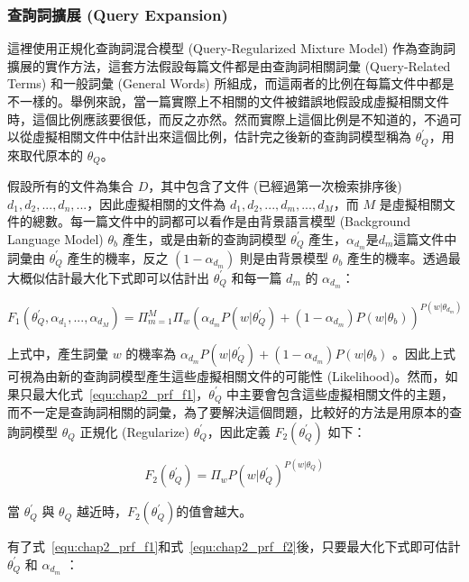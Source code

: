\subsubsection{查詢詞擴展 (Query Expansion)}
\label{sec:prf}
這裡使用正規化查詢詞混合模型 (Query-Regularized Mixture Model) 作為查詢詞擴展的實作方法，這套方法假設每篇文件都是由查詢詞相關詞彙 (Query-Related Terms) 和一般詞彙 (General Words)
所組成，而這兩者的比例在每篇文件中都是不一樣的。舉例來說，當一篇實際上不相關的文件被錯誤地假設成虛擬相關文件時，這個比例應該要很低，而反之亦然。然而實際上這個比例是不知道的，不過可以從虛擬相關文件中估計出來這個比例，估計完之後新的查詢詞模型稱為 $\theta_Q^{'}$，用來取代原本的 $\theta_Q$。

假設所有的文件為集合 $D$，其中包含了文件 (已經過第一次檢索排序後) ${d_1, d_2, ..., d_n, ...}$，因此虛擬相關的文件為 ${d_1, d_2, ..., d_m, ..., d_M}$，而 $M$ 是虛擬相關文件的總數。每一篇文件中的詞都可以看作是由背景語言模型 (Background Language Model) $\theta_b$ 產生，或是由新的查詢詞模型 $\theta_Q^{'}$ 產生，$\alpha_{d_m}$是$d_m$這篇文件中詞彙由 $\theta_Q^{'}$ 產生的機率，反之 $(1-\alpha_{d_m})$ 則是由背景模型 $\theta_b$ 產生的機率。透過最大概似估計最大化下式即可以估計出
$\theta_Q^{'}$ 和每一篇 $d_m$ 的 $\alpha_{d_m}$：

\begin{equation}
\label{equ:chap2_prf_f1}
F_1(\theta_Q^{'}, \alpha_{d_1}, ..., \alpha_{d_M}) = \Pi^M_{m=1} \Pi_w (\alpha_{d_m} P(w|\theta_Q^{'}) + (1 - \alpha_{d_m}) P(w|\theta_b))^{P(w|\theta_{d_m})}
\end{equation}

上式中，產生詞彙 $w$ 的機率為 $\alpha_{d_m} P(w|\theta_Q^{'}) + (1-\alpha_{d_m}) P(w|\theta_b)$ 。因此上式可視為由新的查詢詞模型產生這些虛擬相關文件的可能性 (Likelihood)。然而，如果只最大化式~\ref{equ:chap2_prf_f1}，$\theta_Q^{'}$ 中主要會包含這些虛擬相關文件的主題，而不一定是查詢詞相關的詞彙，為了要解決這個問題，比較好的方法是用原本的查詢詞模型 $\theta_Q$ 正規化 (Regularize) $\theta_Q^{'}$，因此定義 $F_2(\theta_Q^{'})$ 如下：

\begin{equation}
\label{equ:chap2_prf_f2}
F_2(\theta_Q^{'}) = \Pi_w P(w|\theta_Q^{'})^{P(w|\theta_Q)}
\end{equation}

當 $\theta_Q^{'}$ 與 $\theta_Q$ 越近時，$F_2(\theta_Q^{'})$的值會越大。

有了式~\ref{equ:chap2_prf_f1}和式~\ref{equ:chap2_prf_f2}後，只要最大化下式即可估計 $\theta_Q^{'}$ 和 $\alpha_{d_m}$ ：

